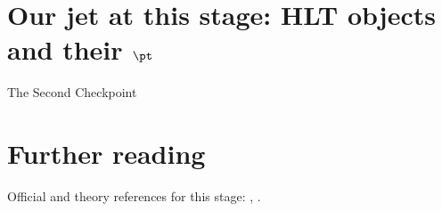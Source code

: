 \section{Our jet at this stage: HLT objects and their $\pt$}
\label{sec:second_checkpoint:our_jet_at_this_stage_hlt_objects_and_th}

\begin{ledger}{The Second Checkpoint}
\end{ledger}

\section{Further reading}
\label{sec:second_checkpoint:further_reading}
Official and theory references for this stage: \cite{CMS:2016ngn}, \cite{CMS:2024aqx}.

\begin{pitfalls}
\end{pitfalls}

\begin{exercises}
\item {}
\item {}
\end{exercises}
